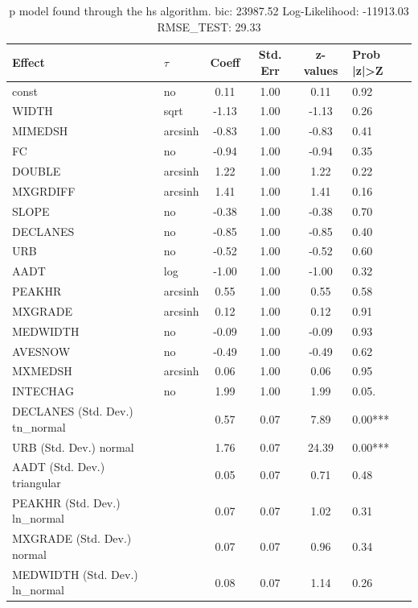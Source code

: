 \begin{table}
	\caption{p model found through the hs algorithm. bic: 23987.52 Log-Likelihood: -11913.03 RMSE_TEST: 29.33}
	\begin{center}
		\begin{tabular}{|l|l|c|c|c|l|}
			\hline
			Effect & $\tau$ & Coeff & Std. Err & z-values & Prob |z|>Z \\
			\hline
			const & no & 0.11 & 1.00 & 0.11 & 0.92 \\
			\hline
			WIDTH & sqrt & -1.13 & 1.00 & -1.13 & 0.26 \\
			\hline
			MIMEDSH & arcsinh & -0.83 & 1.00 & -0.83 & 0.41 \\
			\hline
			FC & no & -0.94 & 1.00 & -0.94 & 0.35 \\
			\hline
			DOUBLE & arcsinh & 1.22 & 1.00 & 1.22 & 0.22 \\
			\hline
			MXGRDIFF & arcsinh & 1.41 & 1.00 & 1.41 & 0.16 \\
			\hline
			SLOPE & no & -0.38 & 1.00 & -0.38 & 0.70 \\
			\hline
			DECLANES & no & -0.85 & 1.00 & -0.85 & 0.40 \\
			\hline
			URB & no & -0.52 & 1.00 & -0.52 & 0.60 \\
			\hline
			AADT & log & -1.00 & 1.00 & -1.00 & 0.32 \\
			\hline
			PEAKHR & arcsinh & 0.55 & 1.00 & 0.55 & 0.58 \\
			\hline
			MXGRADE & arcsinh & 0.12 & 1.00 & 0.12 & 0.91 \\
			\hline
			MEDWIDTH & no & -0.09 & 1.00 & -0.09 & 0.93 \\
			\hline
			AVESNOW & no & -0.49 & 1.00 & -0.49 & 0.62 \\
			\hline
			MXMEDSH & arcsinh & 0.06 & 1.00 & 0.06 & 0.95 \\
			\hline
			INTECHAG & no & 1.99 & 1.00 & 1.99 & 0.05. \\
			\hline
			DECLANES (Std. Dev.) tn_normal &  & 0.57 & 0.07 & 7.89 & 0.00*** \\
			\hline
			URB (Std. Dev.) normal &  & 1.76 & 0.07 & 24.39 & 0.00*** \\
			\hline
			AADT (Std. Dev.) triangular &  & 0.05 & 0.07 & 0.71 & 0.48 \\
			\hline
			PEAKHR (Std. Dev.) ln_normal &  & 0.07 & 0.07 & 1.02 & 0.31 \\
			\hline
			MXGRADE (Std. Dev.) normal &  & 0.07 & 0.07 & 0.96 & 0.34 \\
			\hline
			MEDWIDTH (Std. Dev.) ln_normal &  & 0.08 & 0.07 & 1.14 & 0.26 \\

\end{tabular}
\end{center}
\end{table}
